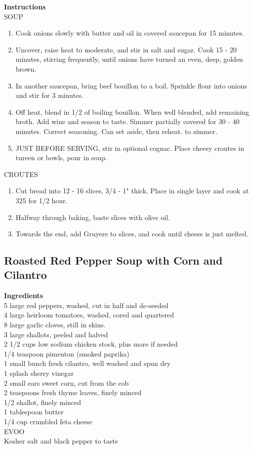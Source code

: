 \documentclass{article}
\numberwithin{figure}{section}
\numberwithin{equation}{section}
\begin{document}
{\bf Instructions}\\
SOUP
\begin{enumerate}
\item Cook onions slowly with butter and oil in covered saucepan for 15 minutes.
\item Uncover, raise heat to moderate, and stir in salt and sugar.  Cook 15 - 20 minutes, stirring frequently, until onions have turned an even, deep, golden brown.
\item In another saucepan, bring beef bouillon to a boil. Sprinkle flour into onions and stir for 3 minutes.
\item Off heat, blend in 1/2 of boiling bouillon. When well blended, add remaining broth. Add wine and season to taste. Simmer partially covered for 30 - 40 minutes. Correct seasoning. Can set aside, then reheat. to simmer.
\item JUST BEFORE SERVING, stir in optional cognac. Place cheesy croutes in tureen or bowls, pour in soup.
\end{enumerate}

CROUTES
\begin{enumerate}
\item Cut bread into 12 - 16 slices, 3/4 - 1" thick.  Place in single layer and cook at 325 for 1/2 hour.
\item Halfway through baking, baste slices with olive oil.
\item Towards the end, add Gruyere to slices, and cook until cheese is just melted.
\end{enumerate}


\pagebreak
\subsection{Roasted Red Pepper Soup with Corn and Cilantro}
{\bf Ingredients}\\
5 large red peppers, washed, cut in half and de-seeded\\
4 large heirloom tomatoes, washed, cored and quartered\\
8 large garlic cloves, still in skins. \\ 
3 large shallots, peeled and halved\\
2 1/2 cups low sodium chicken stock, plus more if needed\\
1/4 teaspoon pimenton (smoked paprika)\\
1 small bunch fresh cilantro, well washed and spun dry\\
1 splash sherry vinegar\\
2 small ears sweet corn, cut from the cob\\
2 teaspoons fresh thyme leaves, finely minced\\
1/2 shallot, finely minced\\
1 tablespoon butter\\
1/4 cup crumbled feta cheese\\
EVOO\\
Kosher salt and black pepper to taste\\
\end{document}
